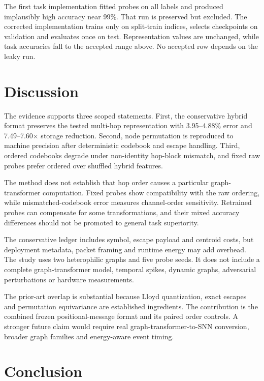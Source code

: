 \documentclass{article}
\begin{document}
\label{sec:leakage_audit_and_negative_evidence}

The first task implementation fitted probes on all labels and produced implausibly high accuracy near 99\%. That run is preserved but excluded. The corrected implementation trains only on split-train indices, selects checkpoints on validation and evaluates once on test. Representation values are unchanged, while task accuracies fall to the accepted range above. No accepted row depends on the leaky run.

\section{Discussion}

\label{sec:discussion}

The evidence supports three scoped statements. First, the conservative hybrid format preserves the tested multi-hop representation with 3.95--4.88\% error and 7.49--7.60$\times$ storage reduction. Second, node permutation is reproduced to machine precision after deterministic codebook and escape handling. Third, ordered codebooks degrade under non-identity hop-block mismatch, and fixed raw probes prefer ordered over shuffled hybrid features.

The method does not establish that hop order causes a particular graph-transformer computation. Fixed probes show compatibility with the raw ordering, while mismatched-codebook error measures channel-order sensitivity. Retrained probes can compensate for some transformations, and their mixed accuracy differences should not be promoted to general task superiority.

The conservative ledger includes symbol, escape payload and centroid costs, but deployment metadata, packet framing and runtime energy may add overhead. The study uses two heterophilic graphs and five probe seeds. It does not include a complete graph-transformer model, temporal spikes, dynamic graphs, adversarial perturbations or hardware measurements.

The prior-art overlap is substantial because Lloyd quantization, exact escapes and permutation equivariance are established ingredients. The contribution is the combined frozen positional-message format and its paired order controls. A stronger future claim would require real graph-transformer-to-SNN conversion, broader graph families and energy-aware event timing.

\section{Conclusion}
\end{document}
